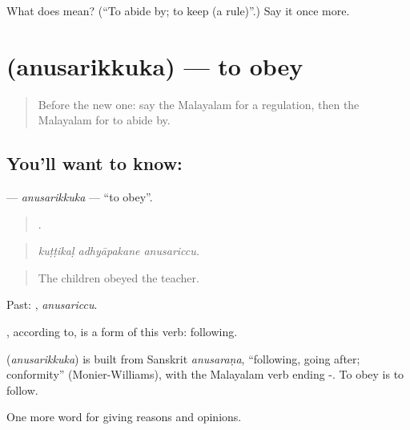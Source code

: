 \begin{tcolorbox}[breakable,colback=teal!4,colframe=teal!35!black,title={Before you move on}]
What does  mean? (\textquotedblleft{}To abide by; to keep (a rule)\textquotedblright{}.) Say it once more.
\end{tcolorbox}
\section[\texorpdfstring{\ml{അനുസരിക്കുക} (anusarikkuka)}{അനുസരിക്കുക (anusarikkuka)}]{ (anusarikkuka) — to obey}

\label{lesson:ML-C417-anusarikkuka}



\begin{quote}
Before the new one: say the Malayalam for a regulation, then the Malayalam for to abide by.
\end{quote}

\subsection*{You'll want to know: }
\textbf{} — \emph{anusarikkuka} — \textquotedblleft{}to obey\textquotedblright{}.

\begin{quote}
  .
\end{quote}

\begin{quote}
\emph{kuṭṭikaḷ adhyāpakane anusariccu.}
\end{quote}

\begin{quote}
The children obeyed the teacher.
\end{quote}

Past: , \emph{anusariccu}.

, according to, is a form of this verb: following.

\begin{cousinweb}
\textbf{} (\emph{anusarikkuka}) is built from Sanskrit \emph{anusaraṇa}, \textquotedblleft{}following, going after; conformity\textquotedblright{} (Monier-Williams), with the Malayalam verb ending -. To obey is to follow.
\end{cousinweb}

\begin{grammarlens}[title={What you've built}]
One more word for giving reasons and opinions.
\end{grammarlens}

